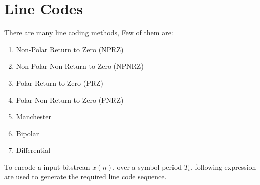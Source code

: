 \chapter{Line Codes}
\setlength{\parindent}{0pt}
There are many line coding methods, Few of them are:

\begin{enumerate}
	\item Non-Polar Return to Zero (NPRZ)
	\item Non-Polar Non Return to Zero (NPNRZ)
	\item Polar Return to Zero (PRZ)
	\item Polar Non Return to Zero (PNRZ)
	\item Manchester
	\item Bipolar
	\item Differential
\end{enumerate}
To encode a input bitstrean $x(n)$, over a symbol period $T_b$,
following expression are used to generate the required line code sequence.

